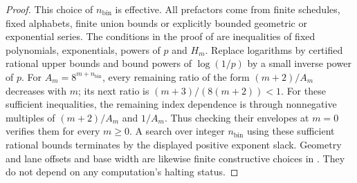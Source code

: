 \begin{proof}
This choice of \(n_{\mathrm{bin}}\) is effective. All prefactors come from finite schedules, fixed alphabets, finite union bounds or explicitly bounded geometric or exponential series. The conditions in the proof of \cite[Lemma~\ref*{cl:lem:stripes}]{DMNoise1D2026} are inequalities of fixed polynomials, exponentials, powers of \(p\) and \(H_{m}\). Replace logarithms by certified rational upper bounds and bound powers of \(\log (1/p)\) by a small inverse power of \(p\). For \(A_{m}=8^{m+n_{\mathrm{bin}}}\), every remaining ratio of the form \((m+2)/A_{m}\) decreases with \(m\); its next ratio is \((m+3)/(8(m+2))<1\). For these sufficient inequalities, the remaining index dependence is through nonnegative multiples of \((m+2)/A_{m}\) and \(1/A_{m}\). Thus checking their envelopes at \(m=0\) verifies them for every \(m\ge 0\). A search over integer \(n_{\mathrm{bin}}\) using these sufficient rational bounds terminates by the displayed positive exponent slack. Geometry and lane offsets and base width are likewise finite constructive choices in \cite[Section~\ref*{cl:sec:construction} and Appendix~\ref*{cl:sec:constants}]{DMNoise1D2026}. They do not depend on any computation's halting status.


\end{proof}

